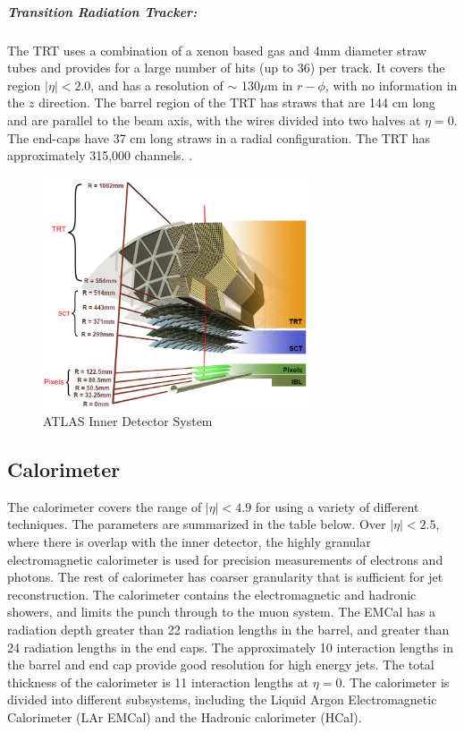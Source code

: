 \subparagraph{Transition Radiation Tracker:} The TRT uses a combination of a xenon based gas and 4mm diameter straw tubes and provides for a large number of hits (up to 36) per track. It covers the region $|\eta| <  2.0$, and has a resolution of $\sim$ 130$\mu$m in $r-\phi$, with no information in the $z$ direction. The barrel region of the TRT has straws that are 144 cm long and are parallel to the beam axis, with the wires divided into two halves at $\eta = 0$. The end-caps have 37 cm long straws in a radial configuration. The TRT has approximately 315,000 channels. \cite{Aad:2008zzm}.


\begin{figure}[ht]
	\centering
        \includegraphics[width=0.7\textwidth]{figures/setup/inner_det.png}
          \caption{ATLAS Inner Detector System}
          \label{fig:inner_det}
\end{figure}

\subsection{Calorimeter}
The calorimeter covers the range of $|\eta| < 4.9$ for using a variety of different techniques. The parameters are summarized in the table below. Over  $|\eta| < 2.5$, where there is overlap with the inner detector, the highly granular electromagnetic calorimeter is used for precision measurements of electrons and photons. The rest of calorimeter has coarser granularity that is sufficient for jet reconstruction. The calorimeter contains the electromagnetic and hadronic showers, and limits the punch through to the muon system. The EMCal has a radiation depth greater than 22 radiation lengths in the barrel, and greater than 24 radiation lengths in the end caps. The approximately 10 interaction lengths in the barrel and end cap provide good resolution for high energy jets. The total thickness of the calorimeter is 11 interaction lengths at $\eta = 0$. The calorimeter is divided into different subsystems, including the Liquid Argon Electromagnetic Calorimeter (LAr EMCal) and the Hadronic calorimeter (HCal).

